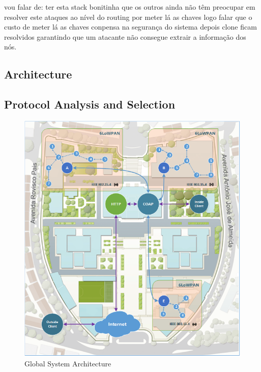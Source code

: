 

vou falar de:
 ter esta stack bonitinha que os outros ainda não têm
 preocupar em resolver este ataques ao nível do routing por meter lá as chaves logo
 falar que o custo de meter lá as chaves conpensa na segurança do sistema depois
 clone ficam resolvidos garantindo que um atacante não consegue extrair a informação dos nós.
 


\subsection{Architecture}
\subsection{Protocol Analysis and Selection}

\begin{figure}[h]
  \centering
  \includegraphics[width=0.8\linewidth]{figures/Global_Architecture.png}
  \caption{Global System Architecture}
  \label{fig:global_architecture}
\end{figure}